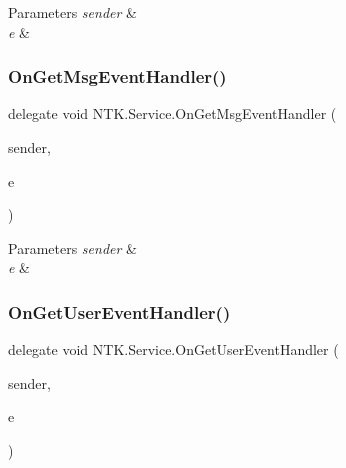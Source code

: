 \begin{DoxyParams}{Parameters}
{\em sender} & \\
\hline
{\em e} & \\
\hline
\end{DoxyParams}
\mbox{\label{namespace_n_t_k_1_1_service_a937b2f893bc924fb0e8aaeac52f0f18e}} 
\subsubsection{\texorpdfstring{OnGetMsgEventHandler()}{OnGetMsgEventHandler()}}
{\footnotesize\ttfamily delegate void N\+T\+K.\+Service.\+On\+Get\+Msg\+Event\+Handler (\begin{DoxyParamCaption}\item[{object}]{sender,  }\item[{\mbox{\hyperlink{class_n_t_k_1_1_events_args_1_1_get_msg_event_args}{Get\+Msg\+Event\+Args}}}]{e }\end{DoxyParamCaption})}






\begin{DoxyParams}{Parameters}
{\em sender} & \\
\hline
{\em e} & \\
\hline
\end{DoxyParams}
\mbox{\label{namespace_n_t_k_1_1_service_a51bf57675f3325cb27da64ad2987252b}} 
\subsubsection{\texorpdfstring{OnGetUserEventHandler()}{OnGetUserEventHandler()}}
{\footnotesize\ttfamily delegate void N\+T\+K.\+Service.\+On\+Get\+User\+Event\+Handler (\begin{DoxyParamCaption}\item[{object}]{sender,  }\item[{\mbox{\hyperlink{class_n_t_k_1_1_events_args_1_1_get_user_event_args}{Get\+User\+Event\+Args}}}]{e }\end{DoxyParamCaption})}






